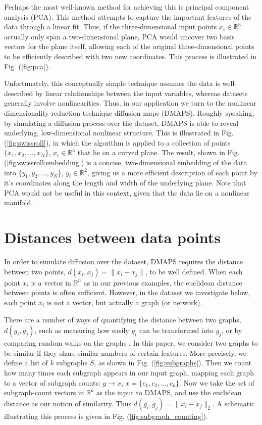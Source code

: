 \documentclass[11pt]{article}
\begin{document}
Perhaps the most well-known method for achieving this is principal component analysis (PCA). This method attempts to capture the important features of the data through a linear fit. Thus, if the three-dimensional input points $x_i \in \mathbb{R}^3$ actually only span a two-dimensional plane, PCA would uncover two basis vectors for the plane itself, allowing each of the original three-dimensional points to be efficiently described with two new coordinates. This process is illustrated in Fig. (\ref{fig:pca}).

Unfortunately, this conceptually simple technique assumes the data is well-described by linear relationships between the input variables, whereas datasets generally involve nonlinearities. Thus, in our application we turn to the nonlinear dimensionality reduction technique diffusion maps (DMAPS). Roughly speaking, by simulating a diffusion process over the dataset, DMAPS is able to reveal underlying, low-dimensional nonlinear structure. This is illustrated in Fig. (\ref{fig:swissroll}), in which the algorithm is applied to a collection of points $\{x_1, x_2, ..., x_N\}$, $x_i \in \mathbb{R}^3$ that lie on a curved plane. The result, shown in Fig. (\ref{fig:swissroll:embedding}) is a concise, two-dimensional embedding of the data into $\{y_1, y_2, ..., y_N\}$, $y_i \in \mathbb{R}^2$, giving us a more efficient description of each point by it's coordinates along the length and width of the underlying plane. Note that PCA would not be useful in this context, given that the data lie on a nonlinear manifold.

\section{Distances between data points}
In order to simulate diffusion over the dataset, DMAPS requires the distance between two points, $d(x_i, x_j) = \| x_i - x_j \|$, to be well defined. When each point $x_i$ is a vector in $\mathbb{R}^n$ as in our previous examples, the euclidean distance between points is often sufficient. However, in the dataset we investigate below, each point $x_i$ is not a vector, but actually a graph (or network).

There are a number of ways of quantifying the distance between two graphs, $d(g_i, g_j)$, such as measuring how easily $g_i$ can be transformed into $g_j$, or by comparing random walks on the graphs \cite{edit_dist} \cite{graph_kernels}. In this paper, we consider two graphs to be similar if they share similar numbers of certain features. More precisely, we define a list of $k$ subgraphs $S$, as shown in Fig. (\ref{fig:subgraphs}). Then we count how many times each subgraph appears in our input graph, mapping each graph to a vector of subgraph counts: $g \rightarrow x$, $x = \{c_1, c_2, \ldots, c_k\}$. Now we take the set of subgraph-count vectors in $\mathbb{R}^k$ as the input to DMAPS, and use the euclidean distance as our notion of similarity. Thus $d(g_i, g_j) = \| x_i - x_j \|_2$. A schematic illustrating this process is given in Fig. (\ref{fig:subgraph_counting}).
\end{document}
